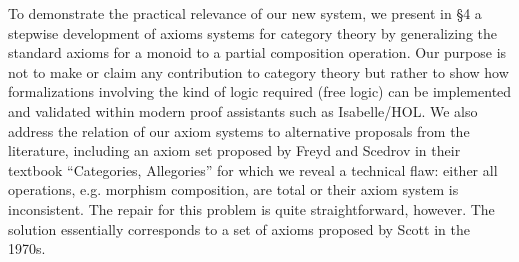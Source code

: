  
  
To demonstrate the practical relevance of our new system, we present
in \S4 a stepwise development of axioms
systems for category theory by generalizing the standard axioms for a
monoid to a partial composition operation. Our purpose is not to make
or claim any contribution to category theory but rather to show how
formalizations involving the kind of logic required (free logic) can
be implemented and validated within modern proof assistants such as
Isabelle/HOL.  We also address the relation of our axiom systems to
alternative proposals from the literature, including an axiom set
proposed by Freyd and Scedrov in their textbook ``Categories,
Allegories'' \cite{FreydScedrov90} for which we reveal a technical
flaw: either all operations, e.g. morphism composition, are total or
their axiom system is inconsistent. The repair for this problem is
quite straightforward, however. The solution essentially corresponds
to a set of axioms proposed by Scott \cite{Scott79} in the 1970s.

